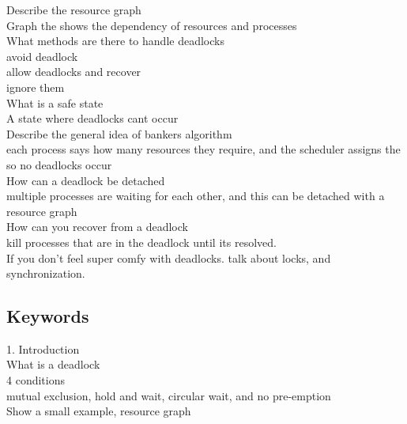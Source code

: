 \documentclass[a4paper,10pt,titlepage]{report}
\begin{document}
Describe the resource graph\\
\hspace{10mm} Graph the shows the dependency of resources and processes \\


What methods are there to handle deadlocks \\
\hspace{10mm} avoid deadlock \\
\hspace{10mm} allow deadlocks and recover \\
\hspace{10mm} ignore them  \\


What is a safe state \\
\hspace{10mm} A state where deadlocks cant occur \\


Describe the general idea of bankers algorithm \\
\hspace{10mm} each process says how many resources they require, and the scheduler assigns the so no deadlocks occur\\


How can a deadlock be detached \\
\hspace{10mm} multiple processes are waiting for each other, and this can be detached with a resource graph \\


How can you recover from a deadlock\\
\hspace{10mm} kill processes that are in the deadlock until its resolved. \\

If you don't feel super comfy with deadlocks. talk about locks, and synchronization.
\newpage
\subsection{Keywords}
1. Introduction\\
\hspace{10mm} What is a deadlock\\
\hspace{10mm} 4 conditions \\
\hspace{20mm} mutual exclusion, hold and wait, circular wait, and no pre-emption \\
\hspace{20mm} Show a small example, resource graph \\
\end{document}
